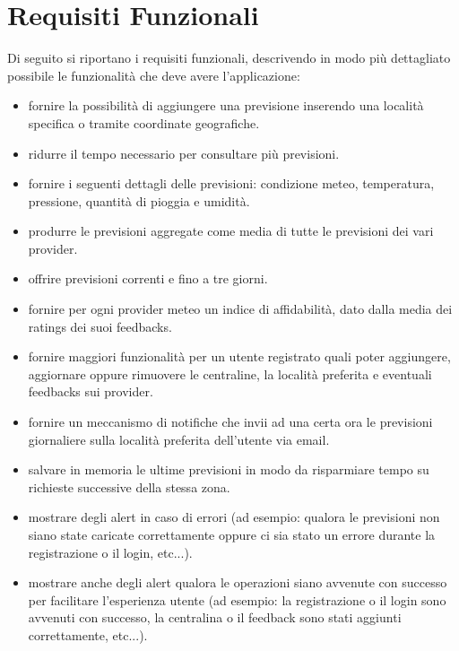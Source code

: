 	\section{Requisiti Funzionali} %
	Di seguito si riportano i requisiti funzionali, descrivendo in modo più dettagliato possibile le funzionalità che deve avere l'applicazione:
	 \begin{itemize}
	 \item fornire la possibilità di aggiungere una previsione inserendo una località specifica o tramite coordinate geografiche.
	\item ridurre il tempo necessario per consultare più previsioni.
	\item fornire i seguenti dettagli delle previsioni: condizione meteo, temperatura, pressione, quantità di pioggia e umidità.
	\item produrre le previsioni aggregate come media di tutte le previsioni dei vari provider.
	\item offrire previsioni correnti e fino a tre giorni.
	\item fornire per ogni provider meteo un indice di affidabilità, dato dalla media dei ratings dei suoi feedbacks.
	\item fornire maggiori funzionalità per un utente registrato quali poter aggiungere, aggiornare oppure rimuovere le centraline, la località preferita e eventuali feedbacks sui provider.
	\item fornire un meccanismo di notifiche che invii ad una certa ora le previsioni giornaliere sulla località preferita dell'utente via email.
	\item salvare in memoria le ultime previsioni in modo da risparmiare tempo su richieste successive della stessa zona. 
	\item mostrare degli alert in caso di errori (ad esempio: qualora le previsioni non siano state caricate correttamente oppure ci sia stato un errore durante la registrazione o il login, etc...).
	\item mostrare anche degli alert qualora le operazioni siano avvenute con successo per facilitare l'esperienza utente (ad esempio: la registrazione o il login sono avvenuti con successo, la centralina o il feedback sono stati aggiunti correttamente, etc...).

	\end{itemize}
